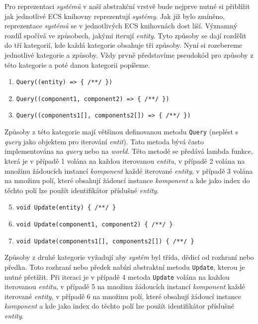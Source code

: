 Pro reprezentaci \textit{systémů} v naší abstrakční vrstvě bude nejprve nutné si přiblížit jak jednotlivé ECS knihovny reprezentují \textit{systémy}. Jak již bylo zmíněno, reprezentace \textit{systémů} se v jednotlivých ECS knihovnách dost liší. Významný rozdíl spočívá ve způsobech, jakými iterují \textit{entity}. Tyto způsoby se dají rozdělit do tří kategorií, kde každá kategorie obsahuje tři způsoby. Nyní si rozebereme jednotlivé kategorie a způsoby. Vždy prvně představíme pseudokód pro způsoby z této kategorie a poté danou kategorii popíšeme.

\begin{enumerate}
    \item \verb|Query((entity) => { /**/ })|
    \item \verb|Query((component1, component2) => { /**/ })|
    \item \verb|Query((components1[], components2[]) => { /**/ })|
\end{enumerate}

Způsoby z této kategorie mají většinou definovanou metodu \verb|Query| (neplést s \textit{query} jako objektem pro iterování \textit{entit}). Tato metoda bývá často implementována na \textit{query} nebo na \textit{world}. Této metodě se předává lambda funkce, která je v případě 1 volána na každou iterovanou \textit{entitu}, v případě 2 volána na množinu žádoucích instancí \textit{komponent} každé iterované \textit{entity}, v případě 3 volána na množinu polí, které obsahují žádoucí instance \textit{komponent} a kde jako index do těchto polí lze použít identifikátor příslušné \textit{entity}.

\begin{enumerate}
    \setcounter{enumi}{4}
    \item \verb|void Update(entity) { /**/ }|
    \item \verb|void Update(component1, component2) { /**/ }|
    \item \verb|void Update(components1[], components2[]) { /**/ }|
\end{enumerate}

Způsoby z druhé kategorie vyžadují aby \textit{systém} byl třída, dědicí od rozhraní nebo předka. Toto rozhraní nebo předek nabízí abstraktní metodu \verb|Update|, kterou je nutné přetížit. Při iteraci je v případě 4 metoda \verb|Update| volána na každou iterovanou \textit{entitu}, v případě 5 na množinu žádoucích instancí \textit{komponent} každé iterované \textit{entity}, v případě 6 na množinu polí, které obsahují žádoucí instance \textit{komponent} a kde jako index do těchto polí lze použít identifikátor příslušné \textit{entity}.

